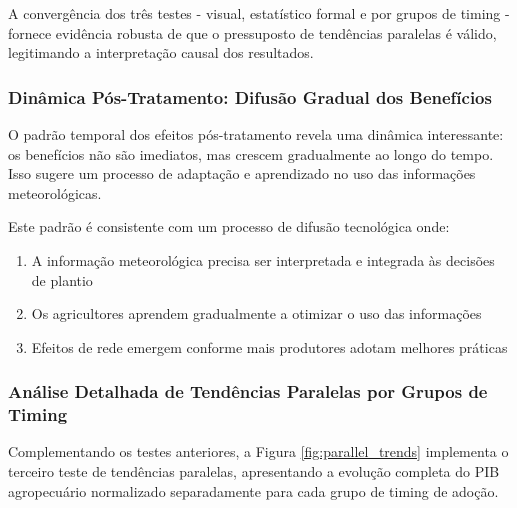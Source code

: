 \documentclass[
	12pt,				%
	oneside,			%
	a4paper,			%
	english,			%
	french,				%
	spanish,			%
	brazil				%
	]{abntex2}
\begin{document}
A convergência dos três testes - visual, estatístico formal e por grupos de timing - fornece evidência robusta de que o pressuposto de tendências paralelas é válido, legitimando a interpretação causal dos resultados.

\subsubsection{Dinâmica Pós-Tratamento: Difusão Gradual dos Benefícios}

O padrão temporal dos efeitos pós-tratamento revela uma dinâmica interessante: os benefícios não são imediatos, mas crescem gradualmente ao longo do tempo. Isso sugere um processo de adaptação e aprendizado no uso das informações meteorológicas.

Este padrão é consistente com um processo de difusão tecnológica onde:
\begin{enumerate}
\item A informação meteorológica precisa ser interpretada e integrada às decisões de plantio
\item Os agricultores aprendem gradualmente a otimizar o uso das informações
\item Efeitos de rede emergem conforme mais produtores adotam melhores práticas
\end{enumerate}

\subsubsection{Análise Detalhada de Tendências Paralelas por Grupos de Timing}

Complementando os testes anteriores, a Figura \ref{fig:parallel_trends} implementa o terceiro teste de tendências paralelas, apresentando a evolução completa do PIB agropecuário normalizado separadamente para cada grupo de timing de adoção.
\end{document}
